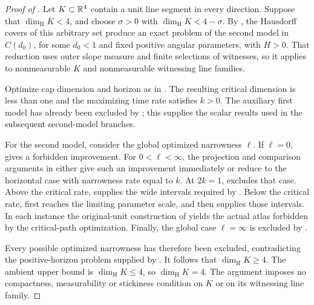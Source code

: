 \begin{proof}[Proof of ]
Let \(K\subset\mathbb R^4\) contain a unit line segment in every direction.
Suppose that \(\dim_{\mathrm H}K<4\), and choose \(\sigma>0\) with
\(\dim_{\mathrm H}K<4-\sigma\).
By , the Hausdorff covers of this arbitrary
set produce an exact problem of the second model in \(C(d_0)\),
for some \(d_0<1\) and fixed positive angular parameters, with
\(H>0\).  That reduction uses outer slope measure and finite
selections of witnesses, so it applies to nonmeasurable \(K\) and
nonmeasurable witnessing line families.

Optimize cap dimension and horizon as in .
The resulting critical dimension is less than one and the
maximizing time rate satisfies \(k>0\).
The auxiliary first model has already been excluded by
; this supplies the scalar results
used in the subsequent second-model branches.

For the second model, consider the global optimized narrowness
\(\ell\).  If \(\ell=0\),  gives a
forbidden improvement.  For \(0<\ell<\infty\), the projection and
comparison arguments in
 either give such an
improvement immediately or reduce to the horizontal case with
narrowness rate equal to \(k\).
At \(2k=1\),  excludes that case.
Above the critical rate,  supplies the
wide intervals required by .
Below the critical rate,  first reaches the
limiting parameter scale, and  then
supplies those intervals.
In each instance the original-unit construction of
 yields the actual atlas forbidden
by the critical-path optimization.
Finally, the global case \(\ell=\infty\) is excluded by
.

Every possible optimized narrowness has therefore been excluded,
contradicting the positive-horizon problem supplied by
.  It follows that
\(\dim_{\mathrm H}K\ge4\).  The ambient upper bound is
\(\dim_{\mathrm H}K\le4\), so \(\dim_{\mathrm H}K=4\).
The argument imposes no compactness, measurability or stickiness
condition on \(K\) or on its witnessing line family.
\end{proof}
